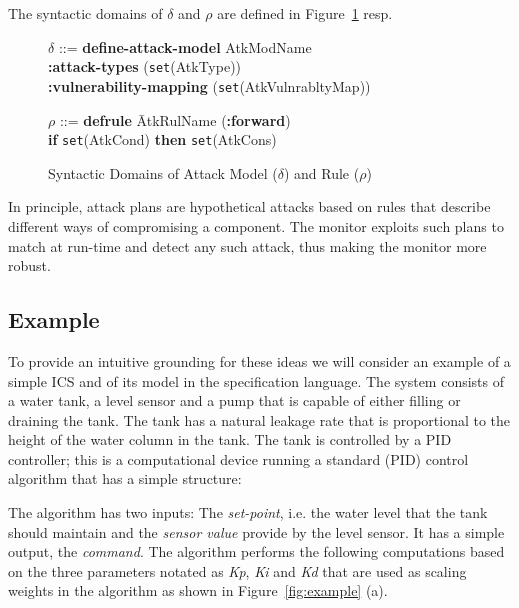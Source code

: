 \documentclass[conference]{IEEEtran}
\begin{document}
The syntactic domains of $\delta$ and $\rho$ are defined in Figure~\ref{fig:attack} resp.

\begin{figure}
\begin{tabbing}
$\delta$ ::= \textbf{define-}\=\textbf{attack-model} AtkModName
\\\> \textbf{:attack-types} \hspace*{1.5cm} (\texttt{set}(AtkType))
\\\> \textbf{:vulnerability-mapping} \hspace*{0.1cm} (\texttt{set}(AtkVulnrabltyMap))
\end{tabbing}

\begin{tabbing}
$\rho$ ::= \textbf{defrule} \=AtkRulName (\textbf{:forward})
\\\> \textbf{if} \texttt{set}(AtkCond) \textbf{then} \texttt{set}(AtkCons)
\end{tabbing}
\caption{Syntactic Domains of Attack Model ($\delta$) and Rule ($\rho$)}
\label{fig:attack}
\end{figure}

In principle, attack plans are hypothetical attacks based on rules that describe different ways of compromising a component. The monitor exploits such plans to match at run-time and detect any such attack, thus making the monitor more robust.

\subsection{Example}\label{subsec:example}
To provide an intuitive grounding for these ideas we will consider an example of a simple ICS and of its model in the specification language.  The system consists of a water tank, a level sensor and a pump that is capable of either filling or draining the tank. The tank has a natural leakage rate that is proportional to the height of the water column in the tank.
The tank is controlled by a PID controller; this is a computational device running a standard (PID) control algorithm that has a simple structure:

The algorithm has two  inputs: The {\em set-point}, i.e. the water level that the tank should maintain and the {\em sensor value} provide by the level sensor.  It has a simple output, the {\em command}.
The algorithm performs the following computations based on the three parameters notated as {\em Kp}, {\em Ki} and {\em Kd} that are used as scaling weights in the algorithm as shown in Figure~\ref{fig:example} (a).
\end{document}
